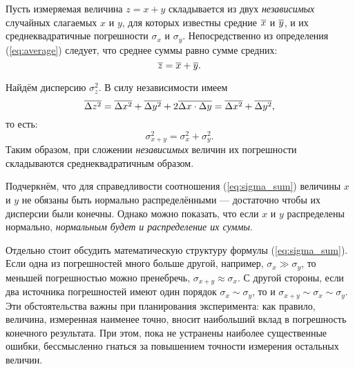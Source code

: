 Пусть измеряемая величина $z=x+y$ складывается из двух \emph{независимых}
случайных слагаемых $x$ и $y$, для которых известны  средние 
$\overline{x}$ и $\overline{y}$, и их среднеквадратичные погрешности
$\sigma_{x}$ и $\sigma_{y}$. Непосредственно из определения (\ref{eq:average})
следует, что среднее суммы равно сумме средних:
\[
    \overline{z}=\overline{x}+\overline{y}.
\]

Найдём дисперсию $\sigma_{z}^{2}$. В силу независимости имеем
\[
    \overline{\Delta z^{2}}=\overline{\Delta x^{2}}+\overline{\Delta
    y^{2}}+2\overline{\Delta x\cdot\Delta y} = \overline{\Delta x^{2}}+
    \overline{\Delta    y^{2}},
\]
то есть:
\begin{equation}
    \label{eq:sigma_sum}
    \sigma_{x+y}^2=\sigma_{x}^{2}+\sigma_{y}^{2}.
\end{equation}
Таким образом, при сложении \emph{независимых} величин их погрешности
складываются среднеквадратичным образом.

Подчеркнём, что для справедливости соотношения (\ref{eq:sigma_sum})
величины $x$ и $y$ не обязаны быть нормально распределёнными ---
достаточно чтобы их дисперсии были конечны. Однако можно
показать, что если $x$ и $y$ распределены нормально, \emph{нормальным
будет и распределение их суммы}.


Отдельно стоит обсудить математическую структуру формулы (\ref{eq:sigma_sum}).
Если одна из погрешностей много больше другой, например,
$\sigma_{x}\gg\sigma_{y}$,
то меньшей погрешностью можно пренебречь, $\sigma_{x+y}\approx\sigma_{x}$.
С другой стороны, если два источника погрешностей имеют один порядок
$\sigma_{x}\sim\sigma_{y}$, то и $\sigma_{x+y}\sim\sigma_{x}\sim\sigma_{y}$.
Эти обстоятельства важны при планирования эксперимента: как правило,
величина, измеренная наименее точно, вносит наибольший вклад в погрешность
конечного результата. При этом, пока не устранены наиболее существенные
ошибки, бессмысленно гнаться за повышением точности измерения остальных
величин.


